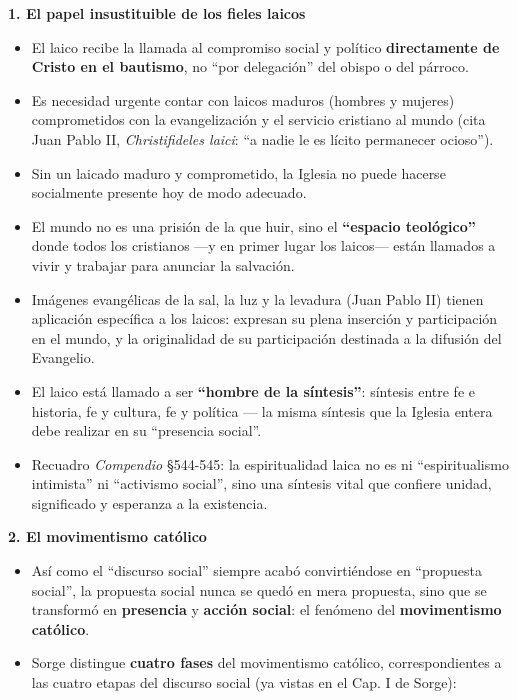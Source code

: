 \documentclass[10pt,a4paper]{article}
\begin{document}
\medskip\noindent \textbf{1. El papel insustituible de los fieles laicos}\par\nopagebreak
\begin{itemize}
\item El laico recibe la llamada al compromiso social y político \textbf{directamente de Cristo en el bautismo}, no ``por delegación'' del obispo o del párroco.
\item Es necesidad urgente contar con laicos maduros (hombres y mujeres) comprometidos con la evangelización y el servicio cristiano al mundo (cita Juan Pablo II, \textit{Christifideles laici}: ``a nadie le es lícito permanecer ocioso'').
\item Sin un laicado maduro y comprometido, la Iglesia no puede hacerse socialmente presente hoy de modo adecuado.
\item El mundo no es una prisión de la que huir, sino el \textbf{``espacio teológico''} donde todos los cristianos ---y en primer lugar los laicos--- están llamados a vivir y trabajar para anunciar la salvación.
\item Imágenes evangélicas de la sal, la luz y la levadura (Juan Pablo II) tienen aplicación específica a los laicos: expresan su plena inserción y participación en el mundo, y la originalidad de su participación destinada a la difusión del Evangelio.
\item El laico está llamado a ser \textbf{``hombre de la síntesis''}: síntesis entre fe e historia, fe y cultura, fe y política --- la misma síntesis que la Iglesia entera debe realizar en su ``presencia social''.
\item Recuadro \textit{Compendio} \S{}544-545: la espiritualidad laica no es ni ``espiritualismo intimista'' ni ``activismo social'', sino una síntesis vital que confiere unidad, significado y esperanza a la existencia.
\end{itemize}

\medskip\noindent \textbf{2. El movimentismo católico}\par\nopagebreak
\begin{itemize}
\item Así como el ``discurso social'' siempre acabó convirtiéndose en ``propuesta social'', la propuesta social nunca se quedó en mera propuesta, sino que se transformó en \textbf{presencia} y \textbf{acción social}: el fenómeno del \textbf{movimentismo católico}.
\item Sorge distingue \textbf{cuatro fases} del movimentismo católico, correspondientes a las cuatro etapas del discurso social (ya vistas en el Cap. I de Sorge):
\end{itemize}
\end{document}
